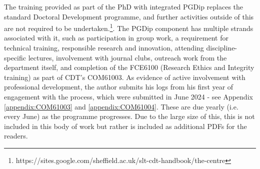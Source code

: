 \documentclass[../main.tex]{subfiles}
\begin{document}
The training provided as part of the PhD with integrated PGDip replaces the standard Doctoral Development programme, and further activities outside of this are not required to be undertaken.\footnote{https://sites.google.com/sheffield.ac.uk/slt-cdt-handbook/the-centre}. The PGDip component has multiple strands associated with it, such as participation in group work, a requirement for technical training, responsible research and innovation, attending discipline-specific lectures, involvement with journal clubs, outreach work from the department itself, and completion of the FCE6100 (Research Ethics and Integrity training) as part of CDT's COM61003. As evidence of active involvement with professional development, the author submits his logs from his first year of engagement with the process, which were submitted in June 2024 - see Appendix \ref{appendix:COM61003} and \ref{appendix:COM61004}. These are due yearly (i.e. every June)  as the programme progresses. Due to the large size of this, this is not included in this body of work but rather is included as additional PDFs for the readers.
\end{document}
